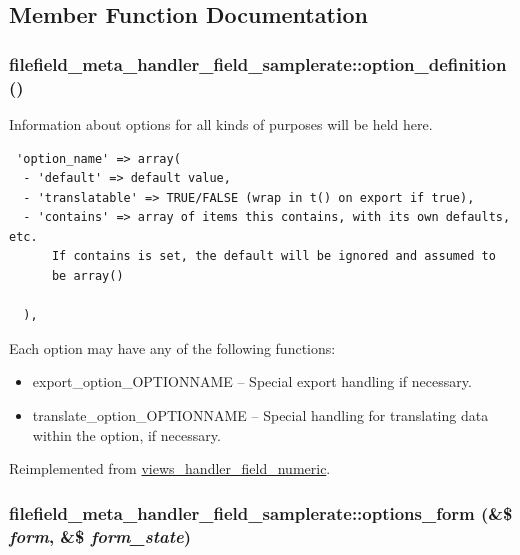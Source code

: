 \subsection{Member Function Documentation}
\hypertarget{classfilefield__meta__handler__field__samplerate_007d94cba3f5de5e8e0c78e8b3b1ef5a}{
\subsubsection[{option\_\-definition}]{\setlength{\rightskip}{0pt plus 5cm}filefield\_\-meta\_\-handler\_\-field\_\-samplerate::option\_\-definition ()}}
\label{classfilefield__meta__handler__field__samplerate_007d94cba3f5de5e8e0c78e8b3b1ef5a}


Information about options for all kinds of purposes will be held here. 

\begin{Code}\begin{verbatim} 'option_name' => array(
  - 'default' => default value,
  - 'translatable' => TRUE/FALSE (wrap in t() on export if true),
  - 'contains' => array of items this contains, with its own defaults, etc.
      If contains is set, the default will be ignored and assumed to
      be array()

  ),
\end{verbatim}
\end{Code}

 Each option may have any of the following functions:\begin{itemize}
\item export\_\-option\_\-OPTIONNAME -- Special export handling if necessary.\item translate\_\-option\_\-OPTIONNAME -- Special handling for translating data within the option, if necessary. \end{itemize}


Reimplemented from \hyperlink{classviews__handler__field__numeric_ab74a55c8b3c564ee995e210a503947b}{views\_\-handler\_\-field\_\-numeric}.\hypertarget{classfilefield__meta__handler__field__samplerate_7ca6744f5ce24aea26f093027538d5ac}{
\subsubsection[{options\_\-form}]{\setlength{\rightskip}{0pt plus 5cm}filefield\_\-meta\_\-handler\_\-field\_\-samplerate::options\_\-form (\&\$ {\em form}, \/  \&\$ {\em form\_\-state})}}
\label{classfilefield__meta__handler__field__samplerate_7ca6744f5ce24aea26f093027538d5ac}



